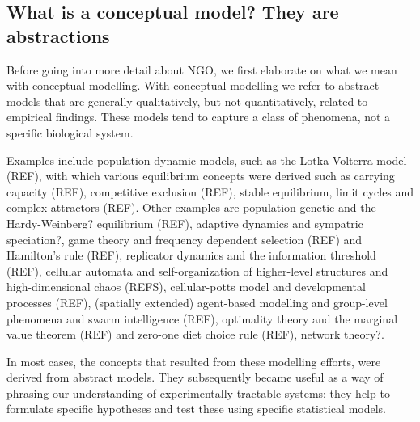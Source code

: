 \subsection{What is a conceptual model? They are abstractions}

Before going into more detail about NGO, we first elaborate on what we mean with conceptual modelling. With conceptual modelling we refer to abstract models that are generally qualitatively, but not quantitatively, related to empirical findings. These models tend to capture a class of phenomena, not a specific biological system.

Examples include population dynamic models, such as the Lotka-Volterra model (REF), with which various equilibrium concepts were derived such as carrying capacity (REF), competitive exclusion (REF), stable equilibrium, limit cycles and complex attractors (REF). Other examples are population-genetic and the Hardy-Weinberg? equilibrium (REF), adaptive dynamics and sympatric speciation?, game theory and frequency dependent selection (REF) and Hamilton’s rule (REF), replicator dynamics and the information threshold (REF), cellular automata and self-organization of higher-level structures and high-dimensional chaos (REFS), cellular-potts model and developmental processes (REF), (spatially extended) agent-based modelling and group-level phenomena and swarm intelligence (REF), optimality theory and the marginal value theorem (REF) and zero-one diet choice rule (REF), network theory?.

In most cases, the concepts that resulted from these modelling efforts, were derived from abstract models. They subsequently became useful as a way of phrasing our understanding of experimentally tractable systems: they help to formulate specific hypotheses and test these using specific statistical models.
  